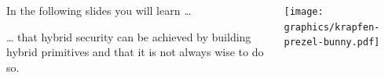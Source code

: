 \begin{frame}[light,s]{}
  \vspace{1cm}
  \large
  \vollkorn

  \begin{columns}[c]
    \begin{column}{.30\linewidth}


      In the following slides you will learn …
      \par\vspace{1.5em}
      … that hybrid security can be achieved by building hybrid primitives and that it is not always wise to do so.
    \end{column}

    \begin{column}{.40\linewidth}
      \texttt{[image: graphics/krapfen-prezel-bunny.pdf]}
    \end{column}
  \end{columns}
\end{frame}

